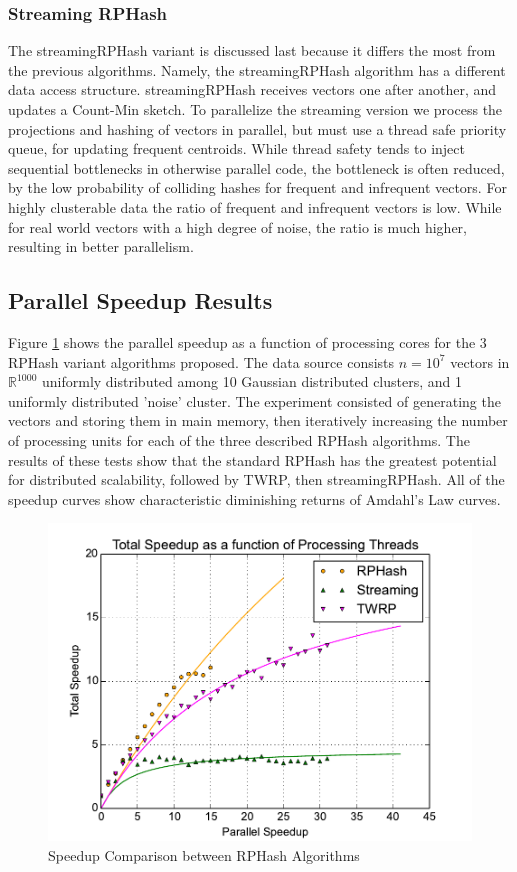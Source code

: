 \subsubsection{Streaming RPHash}

The \textsf{streamingRPHash} variant is discussed last because it differs the most from the previous
algorithms.  Namely, the \textsf{streamingRPHash} algorithm has a different data access structure.
\textsf{streamingRPHash} receives vectors one after another, and updates a Count-Min sketch.  To parallelize
the streaming version we process the projections and hashing of vectors in parallel, but must use a
thread safe priority queue, for updating frequent centroids.  While thread safety tends to inject
sequential bottlenecks in otherwise parallel code, the bottleneck is often reduced, by the low
probability of colliding hashes for frequent and infrequent vectors.  For highly clusterable data
the ratio of frequent and infrequent vectors is low.  While for real world vectors with a high
degree of noise, the ratio is much higher, resulting in better parallelism.

\subsection{Parallel Speedup Results}

Figure \ref{minskispeedup} shows the parallel speedup as a function of processing cores for the 3
\textsf{RPHash} variant algorithms proposed.  The data source consists $n= 10^7$ vectors in
$\mathbb{R}^{1000}$ uniformly distributed among 10 Gaussian distributed clusters, and 1 uniformly
distributed 'noise' cluster.  The experiment consisted of generating the vectors and storing them in
main memory, then iteratively increasing the number of processing units for each of the three
described \textsf{RPHash} algorithms.  The results of these tests show that the standard \textsf{RPHash} has the
greatest potential for distributed scalability, followed by \textsf{TWRP}, then \textsf{streamingRPHash}.
All of the speedup curves show characteristic diminishing returns of Amdahl's Law curves.

\begin{figure}
  \centerline{\includegraphics[width=.8\textwidth]{figs/minskispeedup}}
  \caption{Speedup Comparison between RPHash Algorithms}\label{minskispeedup}
\end{figure}


